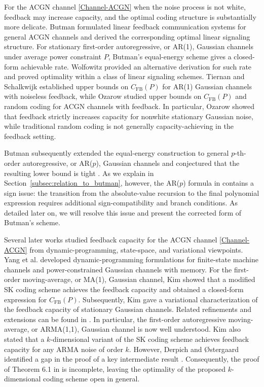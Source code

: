 \documentclass[12pt]{article}
\begin{document}
For the ACGN channel \eqref{Channel-ACGN} when the noise process is not white, feedback may increase capacity, and the optimal coding structure is substantially more delicate. Butman \cite{butman1969} formulated linear feedback communication systems for general ACGN channels and derived the corresponding optimal linear signaling structure. For stationary first-order autoregressive, or AR(1), Gaussian channels under average power constraint \(P\), Butman's equal-energy scheme gives a closed-form achievable rate. Wolfowitz \cite{wolfowitz1975signalling} provided an alternative derivation for such rate and proved optimality within a class of linear signaling schemes. Tiernan and Schalkwijk \cite{Tiernan1974} established upper bounds on $C_\mathrm{FB}(P)$ for AR(1) Gaussian channels with noiseless feedback, while Ozarow \cite{ozarow1990upper,ozarow1990random} studied upper bounds on $C_\mathrm{FB}(P)$ and random coding for ACGN channels with feedback. In particular, Ozarow \cite{ozarow1990random} showed that feedback strictly increases capacity for nonwhite stationary Gaussian noise, while traditional random coding is not generally capacity-achieving in the feedback setting.

Butman subsequently extended the equal-energy construction to general $p$-th-order autoregressive, or AR($p$), Gaussian channels and conjectured that the resulting lower bound is tight \cite{butman1976linear}. As we explain in Section~\ref{subsec:relation_to_butman}, however, the AR($p$) formula in \cite{butman1976linear} contains a sign issue: the transition from the absolute-value recursion to the final polynomial expression requires additional sign-compatibility and branch conditions. As detailed later on, we will resolve this issue and present the corrected form of Butman's scheme.

Several later works studied feedback capacity for the ACGN channel \eqref{Channel-ACGN} from dynamic-programming, state-space, and variational viewpoints. Yang et al. \cite{yang2005feedback,yang2007feedback} developed dynamic-programming formulations for finite-state machine channels and power-constrained Gaussian channels with memory. For the first-order moving-average, or MA(1), Gaussian channel, Kim \cite{Kim2006} showed that a modified SK coding scheme achieves the feedback capacity and obtained a closed-form expression for $C_\mathrm{FB}(P)$. Subsequently, Kim \cite{kim2009feedback} gave a variational characterization of the feedback capacity of stationary Gaussian channels. Related refinements and extensions can be found in \cite{liu2018feedback,sabag2023,su2024feedback}. In particular, the first-order autoregressive moving-average, or ARMA(1,1), Gaussian channel is now well understood. Kim \cite[Theorem 6.1]{kim2009feedback} also stated that a $k$-dimensional variant of the SK coding scheme achieves feedback capacity for any ARMA noise of order $k$. However, Derpich and \O stergaard \cite{derpich2022comments} identified a gap in the proof of a key intermediate result \cite[Corollary 4.4]{kim2009feedback}. Consequently, the proof of Theorem 6.1 in \cite{kim2009feedback} is incomplete, leaving the optimality of the proposed $k$-dimensional coding scheme open in general.
\end{document}
